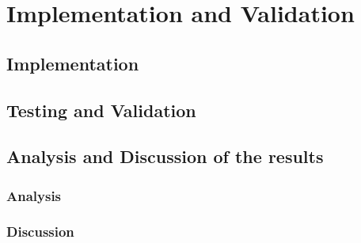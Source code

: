 \chapter{Implementation and Validation}%

\section{Implementation}%

\section{Testing and Validation}%

\section{Analysis and Discussion of the results}%


\subsection{Analysis}
\subsection{Discussion}%